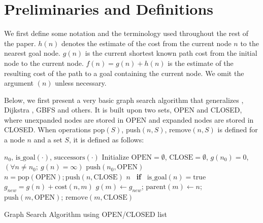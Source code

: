 \section{Preliminaries and Definitions}

\label{sec:preliminaries}

We first define some notation and the terminology used throughout the
rest of the paper.
$h(n)$ denotes the estimate of the cost from the current node $n$ to the nearest goal node.
$g(n)$ is the current shortest known path cost from the initial node to the current node.
$f(n)=g(n)+h(n)$ is the estimate of the resulting cost of the path to a goal
containing the current node.
We omit the argument $(n)$ unless necessary.

Below, we first present a very basic graph search algorithm that generalizes \astar, Dijkstra \cite{dijkstra1959note}, GBFS and others.
It is built upon two sets, OPEN and CLOSED, where unexpanded nodes are stored in OPEN and expanded nodes are stored in CLOSED. When operations pop$(S)$, push$(n,S)$, remove$(n,S)$ is defined for a node $n$ and a set $S$, it is defined as follows:

\begin{algorithm}                      
\begin{algorithmic}
 \REQUIRE $n_0$, $\text{is\_goal}(\cdot)$, $\text{successors}(\cdot)$ %
 \STATE Initialize $\text{OPEN}=\emptyset$, $\text{CLOSE}=\emptyset$, $g(n_0)=0$, $\left(\forall n\not=n_0;\ g(n)=\infty\right)$
 \STATE $\text{push}(n_0,\text{OPEN})$
 \STATE $n = \text{pop}(\text{OPEN}); \text{push}(n,\text{CLOSE})$
 \RETURN $n$ \  \textbf{if} \  $\text{is\_goal}(n)=\text{true}$
 \STATE $g_{new} = g(n) + \text{cost}(n,m)$
 \STATE $g(m) \leftarrow g_{new}$;\; $\text{parent}(m) \leftarrow n$;\; $\text{push}(m,\text{OPEN})$;\; $\text{remove}(m,\text{CLOSE})$
 \ENDIF
 \ENDFOR
 \ENDWHILE
\end{algorithmic}
\caption{Graph Search Algorithm using OPEN/CLOSED list}
\label{alg:ocl}
\end{algorithm}


